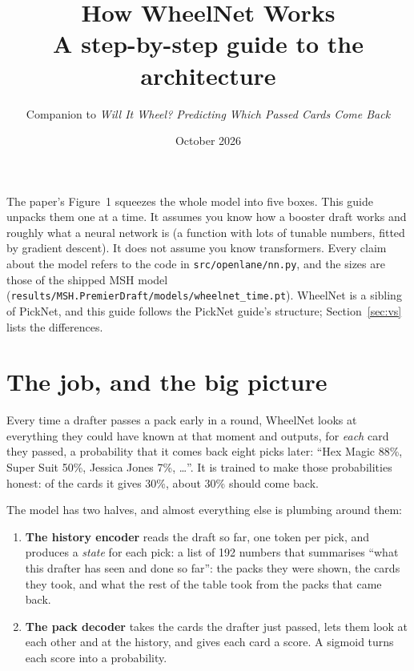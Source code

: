 \documentclass[11pt,letterpaper]{article}
\title{\Large\bfseries How WheelNet Works\\[2pt]\large A step-by-step guide to the architecture}
\author{Companion to \emph{Will It Wheel? Predicting Which Passed Cards Come Back}}
\date{\small October 2026}
\newcommand{\code}[1]{\texttt{\small #1}}
\begin{document}
\maketitle

\noindent The paper's Figure~1 squeezes the whole model into five boxes. This guide unpacks them one at a
time. It assumes you know how a booster draft works and roughly what a neural network is (a function with
lots of tunable numbers, fitted by gradient descent). It does not assume you know transformers. Every
claim about the model refers to the code in \code{src/openlane/nn.py}, and the sizes are those of the
shipped MSH model (\code{results/MSH.PremierDraft/models/wheelnet\_time.pt}). WheelNet is a sibling of
PickNet, and this guide follows the PickNet guide's structure; Section~\ref{sec:vs} lists the differences.

{\small\setlength{\parskip}{0pt}\tableofcontents}

\section{The job, and the big picture}

Every time a drafter passes a pack early in a round, WheelNet looks at everything they could have known at
that moment and outputs, for \emph{each} card they passed, a probability that it comes back eight picks
later: ``Hex Magic 88\%, Super Suit 50\%, Jessica Jones 7\%, \ldots''. It is trained to make those
probabilities honest: of the cards it gives 30\%, about 30\% should come back.

The model has two halves, and almost everything else is plumbing around them:

\begin{enumerate}
\item \textbf{The history encoder} reads the draft so far, one token per pick, and produces a \emph{state}
for each pick: a list of 192 numbers that summarises ``what this drafter has seen and done so far'': the
packs they were shown, the cards they took, and what the rest of the table took from the packs that came
back.
\item \textbf{The pack decoder} takes the cards the drafter just passed, lets them look at each other and at
the history, and gives each card a score. A sigmoid turns each score into a probability.
\end{enumerate}
\end{document}
